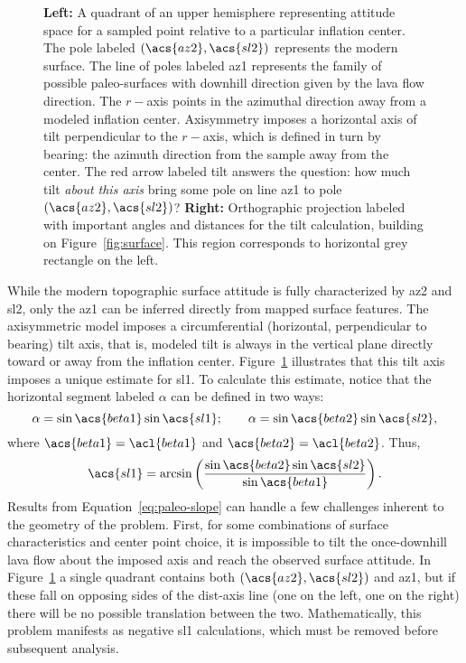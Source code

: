 \begin{figure}
\begin{center}
    \caption[\Acl{tilt} from mapping]{\textbf{Left:} A quadrant of an upper hemisphere representing attitude space for a sampled point relative to a particular inflation center. The pole labeled $\left(\acs{az2},\acs{sl2}\right)$ represents the modern surface. The line of poles labeled \acs{az1} represents the family of possible paleo-surfaces with downhill direction given by the lava flow direction. The $r-$axis points in the azimuthal direction away from a modeled inflation center. Axisymmetry imposes a horizontal axis of tilt perpendicular to the $r-$axis, which is defined in turn by \acs{bearing}: the azimuth direction from the sample away from the center. The red arrow labeled \acs{tilt} answers the question: how much tilt \emph{about this axis} bring some pole on line \acs{az1} to pole $\left(\acs{az2},\acs{sl2}\right)$? \textbf{Right:} Orthographic projection labeled with important angles and distances for the tilt calculation, building on Figure~\ref{fig:surface}. This region corresponds to horizontal grey rectangle on the left.}%
    \label{fig:tilt-from-map}%
\end{center}
\end{figure}
While the modern topographic surface attitude is fully characterized by \acf{az2} and \acf{sl2}, only the \acf{az1} can be inferred directly from mapped surface features. The axisymmetric model imposes a circumferential (horizontal, perpendicular to \acs{bearing}) tilt axis, that is, modeled tilt is always in the vertical plane directly toward or away from the inflation center. Figure~\ref{fig:tilt-from-map} illustrates that this tilt axis imposes a unique estimate for \acf{sl1}. To calculate this estimate, notice that the horizontal segment labeled $\alpha$ can be defined in two ways:
\begin{equation*}
    \alpha = \sin\acs{beta1}\sin\acs{sl1};\qquad
    \alpha = \sin\acs{beta2}\sin\acs{sl2},
\end{equation*}
where $\acs{beta1} = \acl{beta1}$ and $\acs{beta2} = \acl{beta2}$. Thus,
\begin{equation}
    \acs{sl1} = \arcsin\left(\frac{\sin\acs{beta2}\sin\acs{sl2}}{\sin\acs{beta1}}\right).\label{eq:paleo-slope}
\end{equation}
Results from Equation~\eqref{eq:paleo-slope} can handle a few challenges inherent to the geometry of the problem. First, for some combinations of surface characteristics and center point choice, it is impossible to tilt the once-downhill lava flow about the imposed axis and reach the observed surface attitude. In Figure~\ref{fig:tilt-from-map} a single quadrant contains both $\left(\acs{az2},\acs{sl2}\right)$ and \acs{az1}, but if these fall on opposing sides of the \acs{dist}-axis line (one on the left, one on the right) there will be no possible translation between the two. Mathematically, this problem manifests as negative \acf{sl1} calculations, which must be removed before subsequent analysis.

